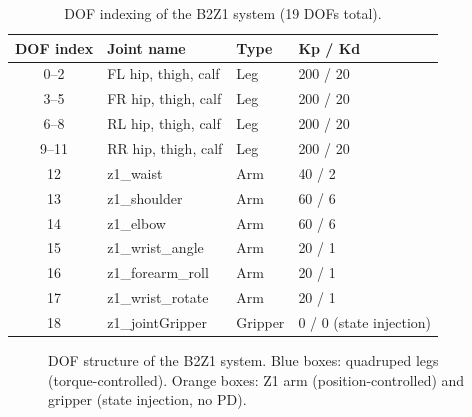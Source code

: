 \begin{table}[htbp]
  \centering
  \caption{DOF indexing of the B2Z1 system (19 DOFs total).}
  \label{tab:dof_structure}
  \renewcommand{\arraystretch}{1.1}
  \begin{tabular}{clll}
    \toprule
    \textbf{DOF index} & \textbf{Joint name} & \textbf{Type} &
    \textbf{Kp / Kd} \\
    \midrule
    0--2   & FL hip, thigh, calf  & Leg & 200 / 20 \\
    3--5   & FR hip, thigh, calf  & Leg & 200 / 20 \\
    6--8   & RL hip, thigh, calf  & Leg & 200 / 20 \\
    9--11  & RR hip, thigh, calf  & Leg & 200 / 20 \\
    12     & z1\_waist            & Arm & 40 / 2   \\
    13     & z1\_shoulder         & Arm & 60 / 6   \\
    14     & z1\_elbow            & Arm & 60 / 6   \\
    15     & z1\_wrist\_angle     & Arm & 20 / 1   \\
    16     & z1\_forearm\_roll    & Arm & 20 / 1   \\
    17     & z1\_wrist\_rotate    & Arm & 20 / 1   \\
    18     & z1\_jointGripper     & Gripper & 0 / 0 (state injection) \\
    \bottomrule
  \end{tabular}
\end{table}

\begin{figure}[htbp]
  \centering
  \caption{DOF structure of the B2Z1 system.  Blue boxes: quadruped legs
           (torque-controlled). Orange boxes: Z1 arm (position-controlled)
           and gripper (state injection, no PD).}
  \label{fig:robot_dof}
\end{figure}

